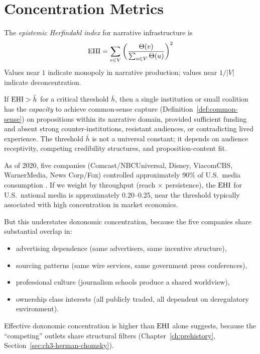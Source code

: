 \section{Concentration Metrics}
\label{sec:ch7-concentration}

\begin{definition}
\label{def:ehhi-infra}
The \emph{epistemic Herfindahl index} for narrative infrastructure is
\[
  \mathrm{EHI} = \sum_{v \in V} \left(\frac{\Theta(v)}{\sum_{u \in V} \Theta(u)}\right)^2
\]
Values near $1$ indicate monopoly in narrative production; values near $1/|V|$ indicate deconcentration.
\end{definition}

\begin{conjecture}
\label{conj:concentration-capture}
If $\mathrm{EHI} > \bar{h}$ for a critical threshold $\bar{h}$, then a single institution or small coalition has the \emph{capacity} to achieve common-sense capture (Definition~\ref{def:common-sense}) on propositions within its narrative domain, provided sufficient funding and absent strong counter-institutions, resistant audiences, or contradicting lived experience.
The threshold $\bar{h}$ is not a universal constant; it depends on audience receptivity, competing credibility structures, and proposition-content fit.
\end{conjecture}

\begin{example}
\label{ex:us-concentration}
As of 2020, five companies (Comcast/NBCUniversal, Disney, ViacomCBS, WarnerMedia, News Corp/Fox) controlled approximately 90\% of U.S.\ media consumption \autocite{bagdikian2004}.
If we weight by throughput (reach $\times$ persistence), the $\mathrm{EHI}$ for U.S.\ national media is approximately 0.20--0.25, near the threshold typically associated with high concentration in market economics.

But this understates doxonomic concentration, because the five companies share substantial overlap in:
\begin{itemize}[nosep]
  \item advertising dependence (same advertisers, same incentive structure),
  \item sourcing patterns (same wire services, same government press conferences),
  \item professional culture (journalism schools produce a shared worldview),
  \item ownership class interests (all publicly traded, all dependent on deregulatory environment).
\end{itemize}
Effective doxonomic concentration is higher than $\mathrm{EHI}$ alone suggests, because the ``competing'' outlets share structural filters (Chapter~\ref{ch:prehistory}, Section~\ref{sec:ch3-herman-chomsky}).
\end{example}

